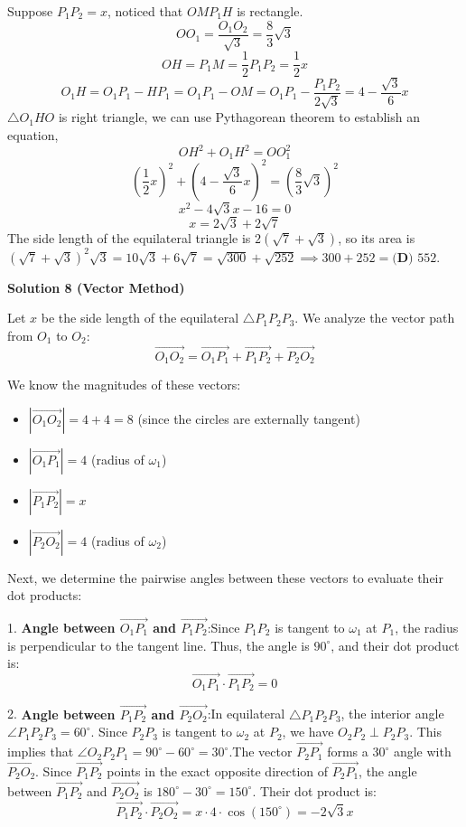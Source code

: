 \begin{enumerate}
 Suppose $P_1P_2 = x$, noticed that $OMP_1H$ is rectangle.
 \[OO_1 = \frac{O_1O_2}{\sqrt{3}} = \frac83\sqrt{3}\]
 \[OH = P_1M = \frac{1}{2}P_1P_2 = \frac12 x\]
 \[O_1H = O_1P_1 - HP_1 = O_1P_1 - OM = O_1P_1 - \frac{P_1P_2}{2\sqrt{3}} = 4 - \frac{\sqrt{3}}{6}x\]$\triangle O_1HO$ is right triangle, we can use Pythagorean theorem to establish an equation,
 \[OH^2 + O_1H^2 = OO_1^2\]
 \[\left(\frac12 x\right)^2 + \left(4 - \frac{\sqrt{3}}{6}x\right)^2 = \left(\frac83\sqrt{3}\right)^2\]
 \[x^2 - 4\sqrt{3}x - 16 = 0\]
 \[x = 2\sqrt{3} + 2\sqrt{7}\]The side length of the equilateral triangle is $2(\sqrt{7} + \sqrt{3})$, so its area is $(\sqrt{7} + \sqrt{3})^2\sqrt{3} = 10\sqrt{3} + 6\sqrt{7} = \sqrt{300} + \sqrt{252} \implies 300 + 252 = \boxed{\textbf{(D) }552}$.

 



\textbf{Solution 8 (Vector Method)}

Let $x$ be the side length of the equilateral $\triangle P_1P_2P_3$. We analyze the vector path from $O_1$ to $O_2$:
 \[\vec{O_1O_2} = \vec{O_1P_1} + \vec{P_1P_2} + \vec{P_2O_2}\]

 We know the magnitudes of these vectors:

 
            \begin{itemize}
        \item $|\vec{O_1O_2}| = 4 + 4 = 8$ (since the circles are externally tangent)
        \item $|\vec{O_1P_1}| = 4$ (radius of $\omega_1$)
        \item $|\vec{P_1P_2}| = x$
        \item $|\vec{P_2O_2}| = 4$ (radius of $\omega_2$)
            \end{itemize}
            Next, we determine the pairwise angles between these vectors to evaluate their dot products:

 1. \textbf{Angle between $\vec{O_1P_1}$ and $\vec{P_1P_2}$}:Since $P_1P_2$ is tangent to $\omega_1$ at $P_1$, the radius is perpendicular to the tangent line. Thus, the angle is $90^\circ$, and their dot product is:
 \[\vec{O_1P_1} \cdot \vec{P_1P_2} = 0\]

 2. \textbf{Angle between $\vec{P_1P_2}$ and $\vec{P_2O_2}$}:In equilateral $\triangle P_1P_2P_3$, the interior angle $\angle P_1P_2P_3 = 60^\circ$. Since $P_2P_3$ is tangent to $\omega_2$ at $P_2$, we have $O_2P_2 \perp P_2P_3$. This implies that $\angle O_2P_2P_1 = 90^\circ - 60^\circ = 30^\circ$.The vector $\vec{P_2P_1}$ forms a $30^\circ$ angle with $\vec{P_2O_2}$. Since $\vec{P_1P_2}$ points in the exact opposite direction of $\vec{P_2P_1}$, the angle between $\vec{P_1P_2}$ and $\vec{P_2O_2}$ is $180^\circ - 30^\circ = 150^\circ$. Their dot product is:
 \[\vec{P_1P_2} \cdot \vec{P_2O_2} = x \cdot 4 \cdot \cos(150^\circ) = -2\sqrt{3}x\]


\end{enumerate}
